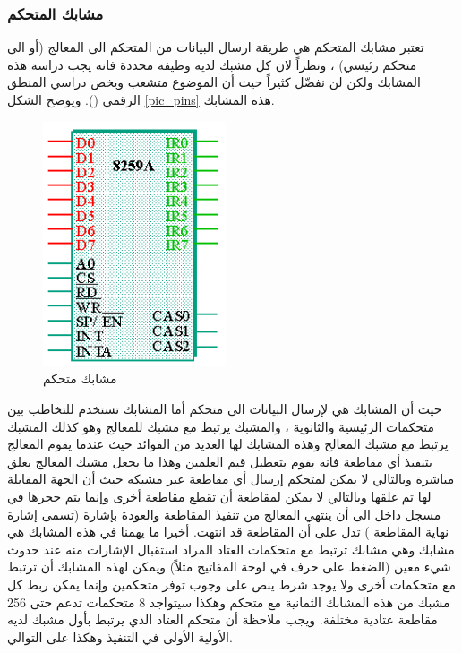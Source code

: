 \documentclass[document.tex]{subfiles}
\begin{document}
\subsubsection{مشابك المتحكم }
تعتبر مشابك المتحكم هي  طريقة ارسال البيانات من المتحكم الى المعالج (أو الى متحكم رئيسي) ، ونظراً لان كل مشبك لديه وظيفة محددة فانه يجب دراسة هذه المشابك ولكن لن نفصِّل كثيراً حيث أن الموضوع متشعب ويخص دراسي المنطق الرقمي (). ويوضح الشكل \ref{pic_pins} هذه المشابك.

\begin{figure}
\label{fig:pic_pins} 
  \vspace{-20pt}
  \begin{center}
    \includegraphics[width=0.48\textwidth]{../img/pic_pins}
  \end{center}
  \vspace{-20pt}
  \caption{مشابك متحكم }
  \vspace{-10pt}
\end{figure}

حيث أن المشابك  هي لإرسال البيانات الى متحكم  أما المشابك  تستخدم للتخاطب بين متحكمات  الرئيسية والثانوية ، والمشبك  يرتبط مع مشبك للمعالج وهو  كذلك المشبك  يرتبط مع مشبك المعالج  وهذه المشابك لها العديد من الفوائد حيث عندما يقوم المعالج بتنفيذ أي مقاطعة فانه يقوم بتعطيل قيم العلمين  وهذا ما يجعل مشبك المعالج  يغلق مباشرة وبالتالي لا يمكن لمتحكم  إرسال أي مقاطعة عبر مشبكه  حيث أن الجهة المقابلة لها تم غلقها وبالتالي لا يمكن لمقاطعة أن تقطع مقاطعة أخرى وإنما يتم حجرها في مسجل داخل  الى أن ينتهي المعالج من تنفيذ المقاطعة والعودة بإشارة (تسمى إشارة نهاية المقاطعة ) تدل على أن المقاطعة قد انتهت. أخيرا ما يهمنا في هذه المشابك هي مشابك  وهي مشابك ترتبط مع متحكمات العتاد المراد استقبال الإشارات منه عند حدوث شيء معين (الضغط على حرف في لوحة المفاتيح مثلاً) ويمكن لهذه المشابك أن ترتبط مع متحكمات  أخرى ولا يوجد شرط ينص على وجوب توفر متحكمين  وإنما يمكن ربط كل مشبك من هذه المشابك الثمانية مع متحكم  وهكذا سيتواجد 8 متحكمات تدعم حتى 256 مقاطعة عتادية مختلفة. ويجب ملاحظة أن متحكم العتاد الذي يرتبط بأول مشبك  لديه الأولية الأولى في التنفيذ وهكذا على التوالي.\\
\end{document}
